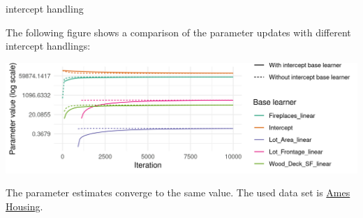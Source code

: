 \documentclass[11pt,compress,t,notes=noshow, xcolor=table]{beamer}
\begin{document}
\begin{vbframe}{intercept handling}

\framebreak

The following figure shows a comparison of the parameter updates with different intercept handlings:
\vspace{0.2cm}
\begin{center}
\includegraphics[width = \textwidth]{figure/compboost-intercept-handling.png}
\end{center}
The parameter estimates converge to the same value. The used data set is \href{https://github.com/topepo/AmesHousing}{Ames Housing}.


\end{vbframe}
\end{document}
